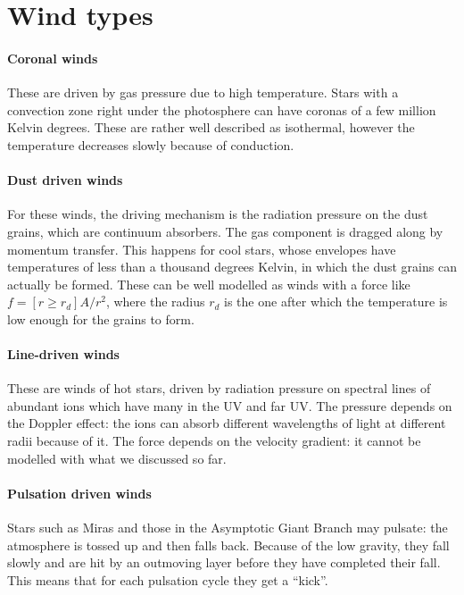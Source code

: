 \documentclass[main.tex]{subfiles}
\begin{document}


\section{Wind types}

\paragraph{Coronal winds}
These are driven by gas pressure due to high temperature.
Stars with a convection zone right under the photosphere can have coronas of a few million Kelvin degrees. 
These are rather well described as isothermal, however the temperature decreases slowly because of conduction.

\paragraph{Dust driven winds}
For these winds, the driving mechanism is the radiation pressure on the dust grains, which are continuum absorbers. The gas component is dragged along by momentum transfer. 
This happens for cool stars, whose envelopes have temperatures of less than a thousand degrees Kelvin, in which the dust grains can actually be formed. 
These can be well modelled as winds with a force like \(f = [r \geq r_d] A / r^2\), where the radius \(r_d\) is the one after which the temperature is low enough for the grains to form.

\paragraph{Line-driven winds}
These are winds of hot stars, driven by radiation pressure on spectral lines of abundant ions which have many in the UV and far UV.
The pressure depends on the Doppler effect: the ions can absorb different wavelengths of light at different radii because of it.
The force depends on the velocity gradient: it cannot be modelled with what we discussed so far.

\paragraph{Pulsation driven winds}
Stars such as Miras and those in the Asymptotic Giant Branch may pulsate: the atmosphere is tossed up and then falls back. Because of the low gravity, they fall slowly and are hit by an outmoving layer before they have completed their fall. 
This means that for each pulsation cycle they get a ``kick''.  
\end{document}
